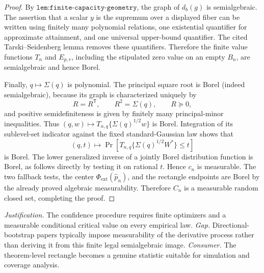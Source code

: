 \documentclass{article}
\begin{document}
\begin{proof}
By \(\texttt{lem:finite-capacity-geometry}\), the graph of \(d_b(g)\) is semialgebraic.  The assertion that a scalar \(y\) is the supremum over a displayed fiber can be written using finitely many polynomial relations, one existential quantifier for approximate attainment, and one universal upper-bound quantifier.  The cited Tarski--Seidenberg lemma removes these quantifiers.  Therefore the finite value functions \(T_n\) and \(E_{p,r}\), including the stipulated zero value on an empty \(B_n\), are semialgebraic and hence Borel.

Finally, \(q\mapsto\Sigma(q)\) is polynomial.  The principal square root is Borel (indeed semialgebraic), because its graph is characterized uniquely by
\[
R=R^{\mathsf T},\qquad R^2=\Sigma(q),\qquad R\succeq0,
\]
and positive semidefiniteness is given by finitely many principal-minor inequalities.  Thus \((q,w)\mapsto T_{n,q}\{\Sigma(q)^{1/2}w\}\) is Borel.  Integration of its sublevel-set indicator against the fixed standard-Gaussian law shows that
\[
(q,t)\longmapsto
\Pr\!\left[T_{n,q}\{\Sigma(q)^{1/2}W^*\}\le t\right]
\]
is Borel.  The lower generalized inverse of a jointly Borel distribution function is Borel, as follows directly by testing it on rational \(t\).  Hence \(c_n\) is measurable.  The two fallback tests, the center \(\Phi_{\mathrm{ext}}(\widehat p_n)\), and the rectangle endpoints are Borel by the already proved algebraic measurability.  Therefore \(C_n\) is a measurable random closed set, completing the proof.
\end{proof}
\par\smallskip\noindent \textit{Justification.} The confidence procedure requires finite optimizers and a measurable conditional critical value on every empirical law. \textit{Gap.} Directional-bootstrap papers typically impose measurability of the derivative process rather than deriving it from this finite legal semialgebraic image. \textit{Consumer.} The theorem-level rectangle becomes a genuine statistic suitable for simulation and coverage analysis.
\end{document}
